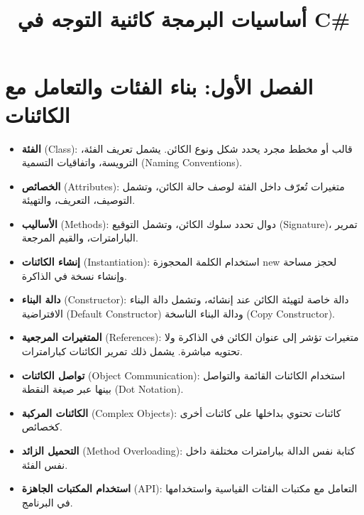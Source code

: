 \documentclass[14pt]{extarticle}
\title{أساسيات البرمجة كائنية التوجه في \textenglish{C\#}}
\begin{document}
\maketitle
\thispagestyle{fancy}

\section{الفصل الأول: بناء الفئات والتعامل مع الكائنات}

\begin{itemize}[itemsep=5pt]
    \item \textbf{الفئة} (\textenglish{Class}): قالب أو مخطط مجرد يحدد شكل ونوع الكائن. يشمل تعريف الفئة، الترويسة، واتفاقيات التسمية (\textenglish{Naming Conventions}).
    \item \textbf{الخصائص} (\textenglish{Attributes}): متغيرات تُعرّف داخل الفئة لوصف حالة الكائن، وتشمل التوصيف، التعريف، والتهيئة.
    \item \textbf{الأساليب} (\textenglish{Methods}): دوال تحدد سلوك الكائن، وتشمل التوقيع (\textenglish{Signature})، تمرير البارامترات، والقيم المرجعة.
    \item \textbf{إنشاء الكائنات} (\textenglish{Instantiation}): استخدام الكلمة المحجوزة \textenglish{new} لحجز مساحة وإنشاء نسخة في الذاكرة.
    \item \textbf{دالة البناء} (\textenglish{Constructor}): دالة خاصة لتهيئة الكائن عند إنشائه، وتشمل دالة البناء الافتراضية (\textenglish{Default Constructor}) ودالة البناء الناسخة (\textenglish{Copy Constructor}).
    \item \textbf{المتغيرات المرجعية} (\textenglish{References}): متغيرات تؤشر إلى عنوان الكائن في الذاكرة ولا تحتويه مباشرة. يشمل ذلك تمرير الكائنات كبارامترات.
    \item \textbf{تواصل الكائنات} (\textenglish{Object Communication}): استخدام الكائنات القائمة والتواصل بينها عبر صيغة النقطة (\textenglish{Dot Notation}).
    \item \textbf{الكائنات المركبة} (\textenglish{Complex Objects}): كائنات تحتوي بداخلها على كائنات أخرى كخصائص.
    \item \textbf{التحميل الزائد} (\textenglish{Method Overloading}): كتابة نفس الدالة ببارامترات مختلفة داخل نفس الفئة.
    \item \textbf{استخدام المكتبات الجاهزة} (\textenglish{API}): التعامل مع مكتبات الفئات القياسية واستخدامها في البرنامج.
\end{itemize}
\end{document}
